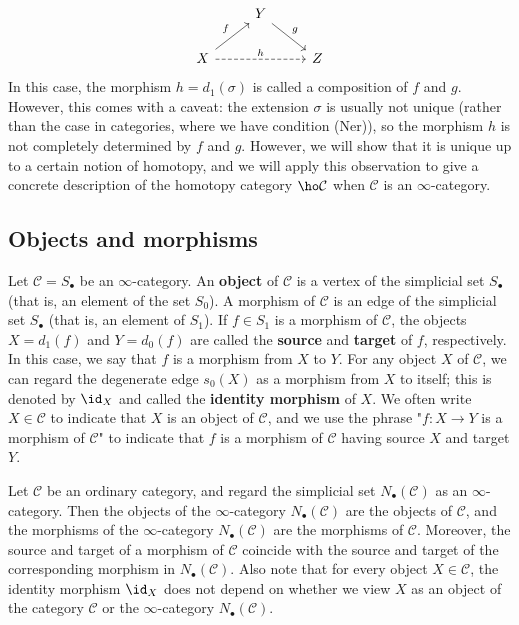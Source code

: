 \[\begin{tikzcd}
&Y\ar[rd,"g"]&\\
X\ar[ru,"f"]\ar[rr,dashed,"h"]&&Z
\end{tikzcd}\]
In this case, the morphism $h=d_1(\sigma)$ is called a composition of $f$ and $g$. However, this comes with a caveat: the extension $\sigma$ is usually not unique (rather than the case in categories, where we have condition (Ner)), so the morphism $h$ is not completely determined by $f$ and $g$. However, we will show that it is unique up to a certain notion of homotopy, and we will apply this observation to give a concrete description of the homotopy category $\ho\mathcal{C}$ when $\mathcal{C}$ is an $\infty$-category.
\subsection{Objects and morphisms}
Let $\mathcal{C}=S_\bullet$ be an $\infty$-category. An \textbf{object} of $\mathcal{C}$ is a vertex of the simplicial set $S_\bullet$ (that is, an element of the set $S_0$). A morphism of $\mathcal{C}$ is an edge of the simplicial set $S_\bullet$ (that is, an element of $S_1$). If $f\in S_1$ is a morphism of $\mathcal{C}$, the objects $X=d_1(f)$ and $Y=d_0(f)$ are called the \textbf{source} and \textbf{target} of $f$, respectively. In this case, we say that $f$ is a morphism from $X$ to $Y$. For any object $X$ of $\mathcal{C}$, we can regard the degenerate edge $s_0(X)$ as a morphism from $X$ to itself; this is denoted by $\id_X$ and called the \textbf{identity morphism} of $X$. We often write $X\in\mathcal{C}$ to indicate that $X$ is an object of $\mathcal{C}$, and we use the phrase "$f:X\to Y$ is a morphism of $\mathcal{C}$" to indicate that $f$ is a morphism of $\mathcal{C}$ having source $X$ and target $Y$.
\begin{example}
Let $\mathcal{C}$ be an ordinary category, and regard the simplicial set $N_\bullet(\mathcal{C})$ as an $\infty$-category. Then the objects of the $\infty$-category $N_\bullet(\mathcal{C})$ are the objects of $\mathcal{C}$, and the morphisms of the $\infty$-category $N_\bullet(\mathcal{C})$ are the morphisms of $\mathcal{C}$. Moreover, the source and target of a morphism of $\mathcal{C}$ coincide with the source and target of the corresponding morphism in $N_\bullet(\mathcal{C})$. Also note that for every object $X\in\mathcal{C}$, the identity morphism $\id_X$ does not depend on whether we view $X$ as an object of the category $\mathcal{C}$ or the $\infty$-category $N_\bullet(\mathcal{C})$.
\end{example}
